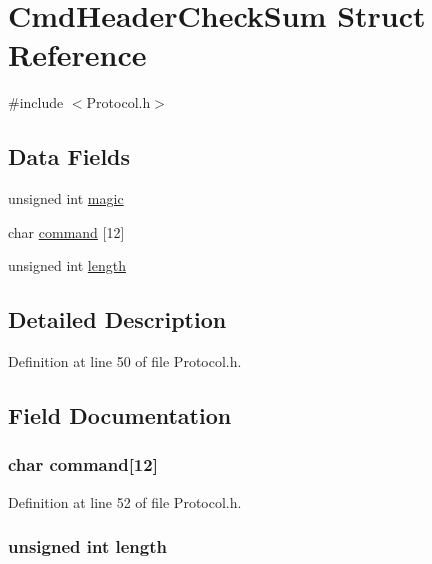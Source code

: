 \hypertarget{struct_cmd_header_check_sum}{
\section{CmdHeaderCheckSum Struct Reference}
\label{struct_cmd_header_check_sum}
}


{\ttfamily \#include $<$Protocol.h$>$}

\subsection*{Data Fields}
\begin{DoxyCompactItemize}
\item 
unsigned int \hyperlink{struct_cmd_header_check_sum_a7154179fe070a40c828f7c03f454d4d6}{magic}
\item 
char \hyperlink{struct_cmd_header_check_sum_a5b9e40150e73a908b8815ab282e5a4d3}{command} \mbox{[}12\mbox{]}
\item 
unsigned int \hyperlink{struct_cmd_header_check_sum_ac8d42bcd4a44e078047ccd7291059238}{length}
\end{DoxyCompactItemize}


\subsection{Detailed Description}


Definition at line 50 of file Protocol.h.



\subsection{Field Documentation}
\hypertarget{struct_cmd_header_check_sum_a5b9e40150e73a908b8815ab282e5a4d3}{
\subsubsection[{command}]{\setlength{\rightskip}{0pt plus 5cm}char {\bf command}\mbox{[}12\mbox{]}}}
\label{struct_cmd_header_check_sum_a5b9e40150e73a908b8815ab282e5a4d3}


Definition at line 52 of file Protocol.h.

\hypertarget{struct_cmd_header_check_sum_ac8d42bcd4a44e078047ccd7291059238}{
\subsubsection[{length}]{\setlength{\rightskip}{0pt plus 5cm}unsigned int {\bf length}}}
\label{struct_cmd_header_check_sum_ac8d42bcd4a44e078047ccd7291059238}


